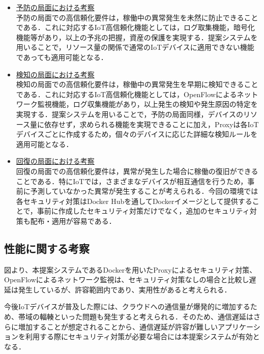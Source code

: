 \documentclass[Japanese]{dicomopapers}
\begin{document}
\begin{itemize}
	\item \underline{予防の局面における考察}\mbox{}\\
	      予防の局面での高信頼化要件は，稼働中の異常発生を未然に防止できることである．これに対応するIoT高信頼化機能としては，ログ取集機能，暗号化機能等があり，以上の予兆の把握，資産の保護を実現する．提案システムを用いることで，リソース量の関係で通常のIoTデバイスに適用できない機能であっても適用可能となる．
	\item \underline{検知の局面における考察}\mbox{}\\
	      検知の局面での高信頼化要件は，稼働中の異常発生を早期に検知できることである．これに対応するIoT高信頼化機能としては，OpenFlowによるネットワーク監視機能，ログ収集機能があり，以上発生の検知や発生原因の特定を実現する．提案システムを用いることで，予防の局面同様，デバイスのリソース量に依存せず，求められる機能を実現できることに加え，Proxyは各IoTデバイスごとに作成するため，個々のデバイスに応じた詳細な検知ルールを適用可能となる．
	\item \underline{回復の局面における考察}\mbox{}\\
	      回復の局面での高信頼化要件は，異常が発生した場合に稼働の復旧ができることである．特にIoTでは，さまざまなデバイスが相互通信を行うため，事前に予測していなかった異常が発生することが考えられる．今回の環境では各セキュリティ対策はDocker Hubを通してDockerイメージとして提供することで，事前に作成したセキュリティ対策だけでなく，追加のセキュリティ対策も配布・適用が容易である．
\end{itemize}

\subsection{性能に関する考察}
図より、本提案システムであるDockerを用いたProxyによるセキュリティ対策、OpenFlowによるネットワーク監視は、セキュリティ対策なしの場合と比較し遅延は発生しているが、許容範囲内であり、実用性があると考えられる．\par
今後IoTデバイスが普及した際には、クラウドへの通信量が爆発的に増加するため、帯域の輻輳といった問題も発生すると考えられる．そのため、通信遅延はさらに増加することが想定されることから、通信遅延が許容が難しいアプリケーションを利用する際にセキュリティ対策が必要な場合には本提案システムが有効となる．
\end{document}
